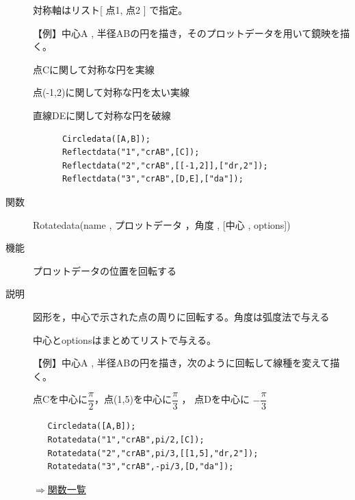 \documentclass[papersize,a4paper,12pt,uplatex]{jsarticle}
\begin{document}
\begin{description}
  対称軸はリスト[ 点1, 点2 ]  で指定。

\vspace{\baselineskip}
【例】中心A , 半径ABの円を描き，そのプロットデータを用いて鏡映を描く。

点Cに関して対称な円を実線

点(-1,2)に関して対称な円を太い実線

直線DEに関して対称な円を破線

\begin{verbatim}
      Circledata([A,B]);
      Reflectdata("1","crAB",[C]);
      Reflectdata("2","crAB",[[-1,2]],["dr,2"]);
      Reflectdata("3","crAB",[D,E],["da"]);
\end{verbatim}
\vspace{\baselineskip}
 \begin{center}  \end{center}


\vspace{\baselineskip}
\hypertarget{rotatedata}{}
\item[関数]  Rotatedata(name , プロットデータ ，角度 , [中心 , options])
\item[機能]  プロットデータの位置を回転する
\item[説明]  図形を，中心で示された点の周りに回転する。角度は弧度法で与える

  中心とoptionsはまとめてリストで与える。

\begin{spacing}{1.5}
【例】中心A , 半径ABの円を描き，次のように回転して線種を変えて描く。

 点Cを中心に$\dfrac{\pi}{2} $，点(1,5)を中心に$\dfrac{\pi}{3}$ ， 点Dを中心に $-\dfrac{\pi}{3} $
\end{spacing}
\begin{verbatim}
   Circledata([A,B]);
   Rotatedata("1","crAB",pi/2,[C]);
   Rotatedata("2","crAB",pi/3,[[1,5],"dr,2"]);
   Rotatedata("3","crAB",-pi/3,[D,"da"]);
\end{verbatim}
\vspace{\baselineskip}
\begin{center}\scalebox{0.9}{  }\end{center}
 
\begin{flushright}  \hyperlink{functionlist}{$\Rightarrow$関数一覧}\end{flushright}


\end{description}
\end{document}
